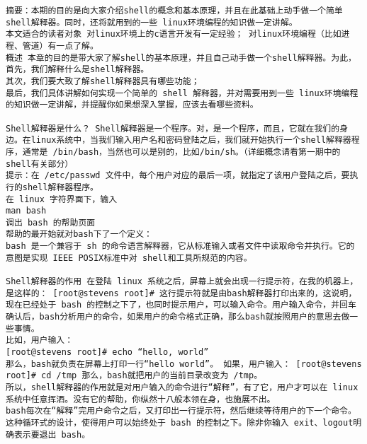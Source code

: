 \begin{lstlisting}
摘要：本期的目的是向大家介绍shell的概念和基本原理，并且在此基础上动手做一个简单shell解释器。同时，还将就用到的一些 linux环境编程的知识做一定讲解。 
本文适合的读者对象 对linux环境上的c语言开发有一定经验； 对linux环境编程（比如进程、管道）有一点了解。 
概述 本章的目的是带大家了解shell的基本原理，并且自己动手做一个shell解释器。为此， 
首先，我们解释什么是shell解释器。 
其次，我们要大致了解shell解释器具有哪些功能； 
最后，我们具体讲解如何实现一个简单的 shell 解释器，并对需要用到一些 linux环境编程的知识做一定讲解，并提醒你如果想深入掌握，应该去看哪些资料。 

Shell解释器是什么？ Shell解释器是一个程序。对，是一个程序，而且，它就在我们的身边。在linux系统中，当我们输入用户名和密码登陆之后，我们就开始执行一个shell解释器程序，通常是 /bin/bash，当然也可以是别的，比如/bin/sh。（详细概念请看第一期中的shell有关部分） 
提示：在 /etc/passwd 文件中，每个用户对应的最后一项，就指定了该用户登陆之后，要执行的shell解释器程序。 
在 linux 字符界面下，输入 
man bash 
调出 bash 的帮助页面 
帮助的最开始就对bash下了一个定义： 
bash 是一个兼容于 sh 的命令语言解释器，它从标准输入或者文件中读取命令并执行。它的意图是实现 IEEE POSIX标准中对 shell和工具所规范的内容。 

Shell解释器的作用 在登陆 linux 系统之后，屏幕上就会出现一行提示符，在我的机器上，是这样的： [root@stevens root]# 这行提示符就是由bash解释器打印出来的，这说明，现在已经处于 bash 的控制之下了，也同时提示用户，可以输入命令。用户输入命令，并回车确认后，bash分析用户的命令，如果用户的命令格式正确，那么bash就按照用户的意思去做一些事情。 
比如，用户输入： 
[root@stevens root]# echo “hello, world” 
那么，bash就负责在屏幕上打印一行“hello world”。 如果，用户输入： [root@stevens root]# cd /tmp 那么，bash就把用户的当前目录改变为 /tmp。 
所以，shell解释器的作用就是对用户输入的命令进行“解释”，有了它，用户才可以在 linux 系统中任意挥洒。没有它的帮助，你纵然十八般本领在身，也施展不出。 
bash每次在“解释”完用户命令之后，又打印出一行提示符，然后继续等待用户的下一个命令。这种循环式的设计，使得用户可以始终处于 bash 的控制之下。除非你输入 exit、logout明确表示要退出 bash。 


\end{lstlisting}
